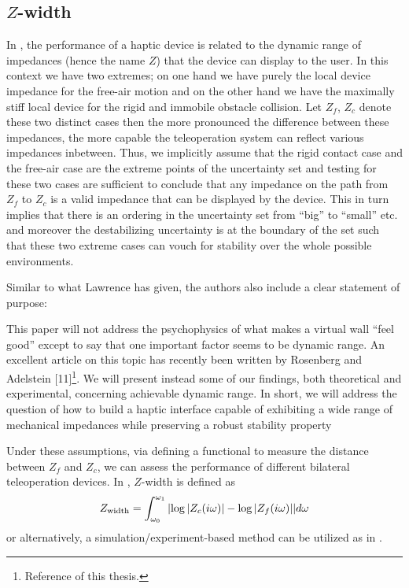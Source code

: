 \subsection{\texorpdfstring{$Z$}{Z}-width}

In \cite{colgate4}, the performance of a haptic device is related to the dynamic range of impedances (hence the name $Z$) that
the device can display to the user. In this context we have two extremes; on one hand we have purely the local device impedance 
for the free-air motion and on the other hand we have the maximally stiff local device for the rigid and immobile obstacle collision. 
Let $Z_f$, $Z_c$ denote these two distinct cases then the more pronounced the difference between these impedances, the more 
capable the teleoperation system can reflect various impedances inbetween. Thus, we implicitly assume that the rigid contact 
case and the free-air case are the extreme points of the uncertainty set and testing for these two cases are sufficient to 
conclude that any impedance on the path from $Z_f$ to $Z_c$ is a valid impedance that can be displayed by the device. This
in turn implies that there is an ordering in the uncertainty set from \enquote{big} to \enquote{small} etc. and moreover 
the destabilizing uncertainty is at the boundary of the set such that these two extreme cases can vouch for stability over 
the whole possible environments.

Similar to what Lawrence has given, the authors also include a clear statement of purpose: 

\begin{displayquote}
This paper will not address the psychophysics of what
makes a virtual wall \enquote{feel good} except to say that one
important factor seems to be dynamic range. An excellent
article on this topic has recently been written by
Rosenberg and Adelstein [11]\footnote{Reference \cite{rosenberg} of this thesis.}. 
We will present instead
some of our findings, both theoretical and experimental,
concerning achievable dynamic range. In short, we will
address the question of how to build a haptic interface
capable of exhibiting a wide range of mechanical
impedances while preserving a robust stability property
\end{displayquote}


Under these assumptions, via defining a functional to measure the distance between $Z_f$ and $Z_c$, we can assess the performance
of different bilateral teleoperation devices. In \cite{goranthesis}, $Z$-width is defined as 
\begin{equation}
Z_{\text{width}} = \int_{\omega_0}^{\omega_1}{\displaystyle \left|\log|Z_{\vphantom{f}c}(i\omega)|-\log |Z_f(i\omega)|\right|}d\omega
\label{eq:zwidth}
\end{equation}
or alternatively, a simulation/experiment-based method can be utilized as in \cite{weir}. 


